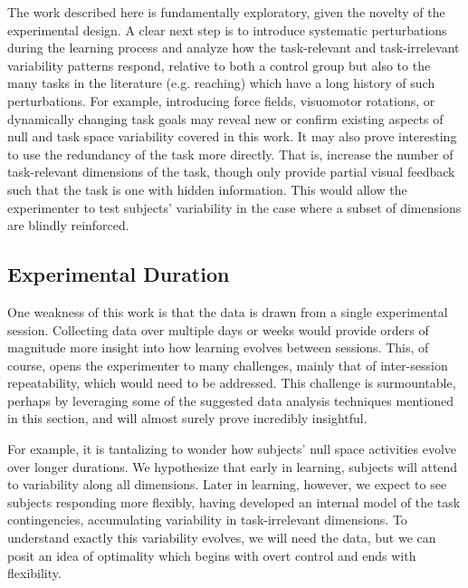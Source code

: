 \documentclass[../main.tex]{subfiles}
\begin{document}
The work described here is fundamentally exploratory, given the novelty of the experimental design. A clear next step is to introduce systematic perturbations during the learning process and analyze how the task-relevant and task-irrelevant variability patterns respond, relative to both a control group but also to the many tasks in the literature (e.g. reaching) which have a long history of such perturbations. For example, introducing force fields, visuomotor rotations, or dynamically changing task goals may reveal new or confirm existing aspects of null and task space variability covered in this work. It may also prove interesting to use the redundancy of the task more directly. That is, increase the number of task-relevant dimensions of the task, though only provide partial visual feedback such that the task is one with hidden information. This would allow the experimenter to test subjects' variability in the case where a subset of dimensions are blindly reinforced.







\subsection{Experimental Duration}

One weakness of this work is that the data is drawn from a single experimental session. Collecting data over multiple days or weeks would provide orders of magnitude more insight into how learning evolves between sessions. This, of course, opens the experimenter to many challenges, mainly that of inter-session repeatability, which would need to be addressed. This challenge is surmountable, perhaps by leveraging some of the suggested data analysis techniques mentioned in this section, and will almost surely prove incredibly insightful.

For example, it is tantalizing to wonder how subjects' null space activities evolve over longer durations. We hypothesize that early in learning, subjects will attend to variability along all dimensions. Later in learning, however, we expect to see subjects responding more flexibly, having developed an internal model of the task contingencies, accumulating variability in task-irrelevant dimensions. To understand exactly this variability evolves, we will need the data, but we can posit an idea of optimality which begins with overt control and ends with flexibility.
\end{document}
